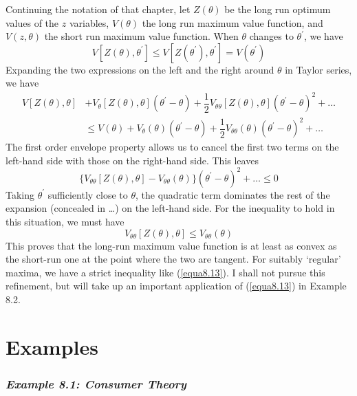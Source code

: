 Continuing the notation of that chapter, let $Z(\theta)$ be the long run optimum values of the $z$ variables, $V(\theta)$ the long run maximum value function, and $V(z, \theta)$ the short run maximum value function. When $\theta$ changes to $\theta^\prime$, we have
\begin{equation*}
  V[  Z(\theta), \theta^\prime ] \leq V[ Z( \theta^\prime ), \theta^\prime ] = V(\theta^\prime)
\end{equation*}
Expanding the two expressions on the left and the right around $\theta$ in Taylor series, we have
\begin{equation*}
\begin{array}{rl}
  V[  Z(\theta), \theta  ] & + V_\theta[ Z(\theta), \theta ](\theta^\prime - \theta) + \dfrac{1}{2} V_{\theta \theta} [ Z(\theta), \theta ](\theta^\prime - \theta)^2 + \dots \\
& \leq V(\theta) + V_\theta(\theta) (\theta^\prime - \theta) + \dfrac{1}{2} V_{\theta \theta} ( \theta )(\theta^\prime - \theta)^2 + \dots
\end{array}
\end{equation*}
The first order envelope property allows us to cancel the first two terms on the left-hand side with those on the right-hand side. This leaves
\begin{equation*}
\{ V_{\theta \theta} [Z(\theta), \theta] - V_{\theta \theta}(\theta) \}(\theta^\prime -\theta)^2 + \dots \leq 0
\end{equation*}
Taking $\theta^\prime$ sufficiently close to $\theta$, the quadratic term dominates the rest of the expansion (concealed in \dots) on the left-hand side. For the inequality to hold in this situation, we must have
\begin{equation} \label{equa8.13}
V_{\theta \theta} [ Z(\theta), \theta ] \leq V_{\theta \theta} (\theta)
\end{equation}
This proves that the long-run maximum value function is at least as convex as the short-run one at the point where the two are tangent. For suitably `regular' maxima, we have a strict inequality like (\ref{equa8.13}). I shall not pursue this refinement, but will take up an important application of (\ref{equa8.13}) in Example 8.2.

\section*{Examples}

\subsubsection*{\textit{Example 8.1: Consumer Theory}}

